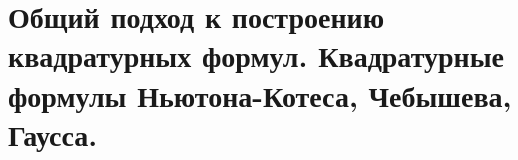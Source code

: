 \documentclass[../../calc-math-exam-2023.tex]{subfiles}
\begin{document}
    \section{Общий подход к построению квадратурных формул. Квадратурные формулы Ньютона-Котеса, Чебышева, Гаусса.}\label{sec:ch10}
\end{document}
